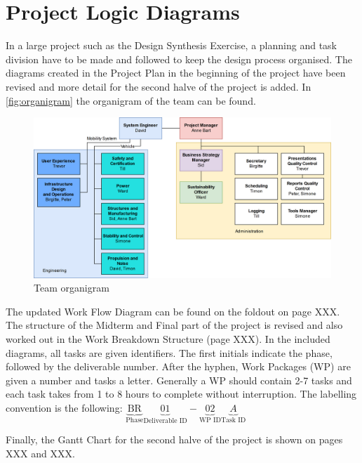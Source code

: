 \newpage
\chapter{Project Logic Diagrams}
\label{ch-diagrams}

In a large project such as the Design Synthesis Exercise, a planning and task division have to be made and followed to keep the design process organised. The diagrams created in the Project Plan in the beginning of the project have been revised and more detail for the second halve of the project is added. In \autoref{fig:organigram} the organigram of the team can be found. 



\begin{figure}[h]
    \centering
    \includegraphics[width=0.9\linewidth]{Figures/organigram.png}
    \caption{Team organigram}
    \label{fig:organigram}
\end{figure}



The updated Work Flow Diagram can be found on the foldout on page XXX. The structure of the Midterm and Final part of the project is revised and also worked out in the Work Breakdown Structure (page XXX). In the included diagrams, all tasks are given identifiers. The first initials indicate the phase, followed by the deliverable number. After the hyphen, Work Packages (WP) are given a number and tasks a letter. Generally a WP should contain 2-7 tasks and each task takes from 1 to 8 hours to complete without interruption. The labelling convention is the following: $\underbrace{\text{BR}}_\text{Phase}\underbrace{01}_\text{Deliverable ID}-\underbrace{02}_\text{WP ID}\underbrace{A}_\text{Task ID}$ 

Finally, the Gantt Chart for the second halve of the project is shown on pages XXX and XXX.





